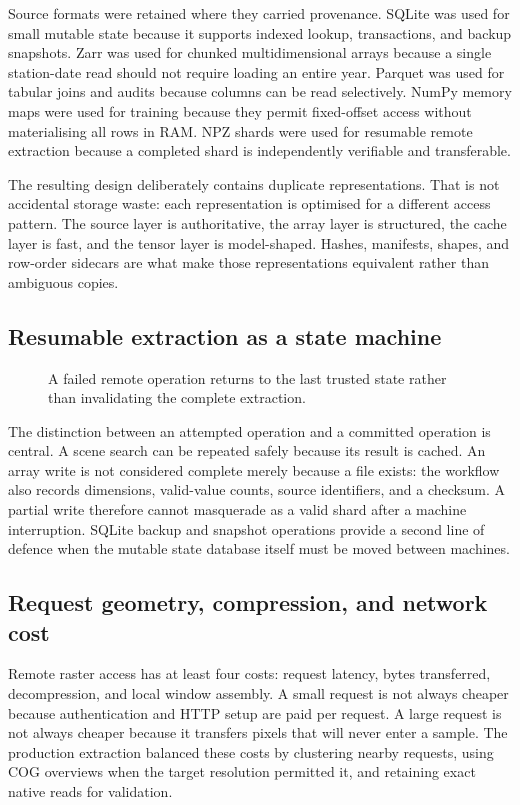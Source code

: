\documentclass[12pt,a4paper]{report}
\begin{document}
Source formats were retained where they carried provenance. SQLite was used for
small mutable state because it supports indexed lookup, transactions, and
backup snapshots. Zarr was used for chunked multidimensional arrays because a
single station-date read should not require loading an entire year. Parquet was
used for tabular joins and audits because columns can be read selectively.
NumPy memory maps were used for training because they permit fixed-offset
access without materialising all rows in RAM. NPZ shards were used for
resumable remote extraction because a completed shard is independently
verifiable and transferable.

The resulting design deliberately contains duplicate representations. That is
not accidental storage waste: each representation is optimised for a different
access pattern. The source layer is authoritative, the array layer is
structured, the cache layer is fast, and the tensor layer is model-shaped.
Hashes, manifests, shapes, and row-order sidecars are what make those
representations equivalent rather than ambiguous copies.

\subsection{Resumable extraction as a state machine}
\begin{figure}[H]
\centering

\caption{A failed remote operation returns to the last trusted state rather than invalidating the complete extraction.}
\label{fig:resume-state}
\end{figure}

The distinction between an attempted operation and a committed operation is
central. A scene search can be repeated safely because its result is cached.
An array write is not considered complete merely because a file exists: the
workflow also records dimensions, valid-value counts, source identifiers, and
a checksum. A partial write therefore cannot masquerade as a valid shard after
a machine interruption. SQLite backup and snapshot operations provide a second
line of defence when the mutable state database itself must be moved between
machines.

\subsection{Request geometry, compression, and network cost}
Remote raster access has at least four costs: request latency, bytes
transferred, decompression, and local window assembly. A small request is not
always cheaper because authentication and HTTP setup are paid per request. A
large request is not always cheaper because it transfers pixels that will never
enter a sample. The production extraction balanced these costs by clustering
nearby requests, using COG overviews when the target resolution permitted it,
and retaining exact native reads for validation.
\end{document}
